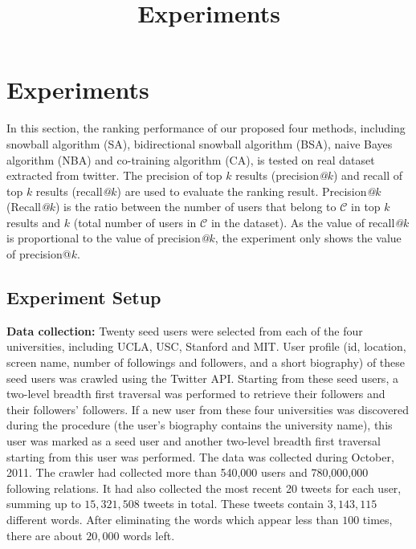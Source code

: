 \documentclass{article}
\begin{document}
\title{Experiments}
\maketitle \else \fi

\newcommand{\at}{\emph{@}}

\section{Experiments}\label{sec:experiment}
In this section, the ranking performance of our proposed four methods, including snowball algorithm (SA), bidirectional snowball algorithm (BSA), naive Bayes algorithm (NBA) and co-training algorithm (CA), is tested on real dataset extracted from twitter. The precision of top $k$ results (precision\at$k$) and recall of top $k$ results (recall\at$k$) are used to evaluate the ranking result. Precision\at$k$ (Recall\at$k$) is the ratio between the number of users that belong to $\mathcal{C}$ in top $k$ results and $k$ (total number of users in $\mathcal{C}$ in the dataset). As the value of recall\at$k$ is proportional to the value of precision\at$k$, the experiment only shows the value of precision@$k$.

\subsection{Experiment Setup}
\textbf{Data collection:} Twenty seed users were selected from each of the four universities, including UCLA, USC, Stanford and MIT. User profile (id, location, screen name, number of followings and followers, and a short biography) of these seed users was crawled using the Twitter API. Starting from these seed users, a two-level breadth first traversal was performed to retrieve their followers and their followers' followers. If a new user from these four universities was discovered during the procedure (the user's biography contains the university name), this user was marked as a seed user and another two-level breadth first traversal starting from this user was performed. The data was collected during October, 2011. The crawler had collected more than 540,000 users and 780,000,000 following relations. It had also collected the most recent 20 tweets for each user, summing up to $15,321,508$ tweets in total. These tweets contain $3,143,115$ different words. After eliminating the words which appear less than $100$ times, there are about $20,000$ words left.
\end{document}
